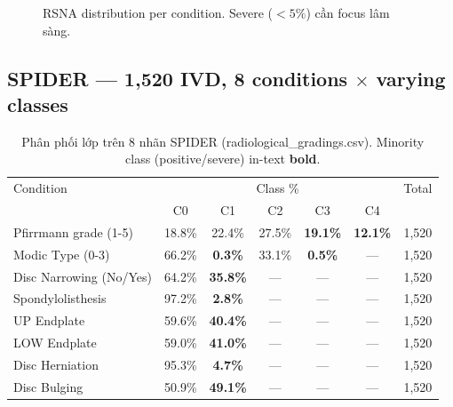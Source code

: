 \documentclass[11pt,a4paper]{article}
\begin{document}
\begin{figure}[h]
\centering
{}
\caption{RSNA distribution per condition. Severe ($<5\%$) cần focus lâm sàng.}
\label{fig:rsna_dist}
\end{figure}

\subsection{SPIDER --- 1{,}520 IVD, 8 conditions $\times$ varying classes}

\begin{table}[h]
\centering
\caption{Phân phối lớp trên 8 nhãn SPIDER (radiological\_gradings.csv).
Minority class (positive/severe) in-text \textbf{bold}.}
\label{tab:spider_distribution}
\small
\begin{tabular}{lcccccc}
\toprule
\rowcolor{tablehdr}
Condition & \multicolumn{5}{c}{Class \%} & Total \\
          & C0 & C1 & C2 & C3 & C4 &       \\
\midrule
Pfirrmann grade (1-5)   & 18.8\% & 22.4\% & 27.5\% & \textbf{19.1\%} & \textbf{12.1\%} & 1{,}520 \\
Modic Type (0-3)        & 66.2\% & \textbf{0.3\%}  & 33.1\% & \textbf{0.5\%}  & --- & 1{,}520 \\
Disc Narrowing (No/Yes) & 64.2\% & \textbf{35.8\%} & --- & --- & --- & 1{,}520 \\
Spondylolisthesis       & 97.2\% & \textbf{2.8\%}  & --- & --- & --- & 1{,}520 \\
UP Endplate             & 59.6\% & \textbf{40.4\%} & --- & --- & --- & 1{,}520 \\
LOW Endplate            & 59.0\% & \textbf{41.0\%} & --- & --- & --- & 1{,}520 \\
Disc Herniation         & 95.3\% & \textbf{4.7\%}  & --- & --- & --- & 1{,}520 \\
Disc Bulging            & 50.9\% & \textbf{49.1\%} & --- & --- & --- & 1{,}520 \\
\bottomrule
\end{tabular}
\end{table}
\end{document}
